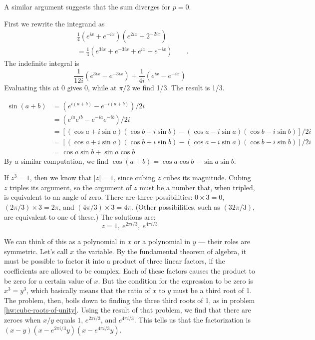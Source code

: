 A similar argument suggests that the sum diverges for $p=0$.


First we rewrite the integrand as
\begin{align*}
  & \frac{1}{4}\left(e^{ix}+e^{-ix}\right)\left(e^{2ix}+2^{-2ix}\right) \\
  &= \frac{1}{4}\left(e^{3ix}+e^{-3ix}+e^{ix}+e^{-ix}\right) \qquad .
\end{align*}
The indefinite integral is
\begin{equation*}
  \frac{1}{12i}\left(e^{3ix}-e^{-3ix}\right)+\frac{1}{4i}\left(e^{ix}-e^{-ix}\right)
\end{equation*}
Evaluating this at 0 gives 0, while at $\pi/2$ we find 1/3. The result is 1/3.

\begin{align*}
\sin(a+b) &= \left(e^{i(a+b)}-e^{-i(a+b)}\right)/2i \\
          &= \left(e^{ia}e^{ib}-e^{-ia}e^{-ib}\right)/2i \\
          &= \left[(\cos a+i\sin a)(\cos b+i\sin b)-(\cos a-i\sin a)(\cos b-i\sin b)\right]/2i \\
          &= \left[(\cos a+i\sin a)(\cos b+i\sin b)-(\cos a-i\sin a)(\cos b-i\sin b)\right]/2i \\
          &= \cos a\sin b +\sin a\cos b 
\end{align*}
By a similar computation, we find $\cos(a+b)=\cos a\cos b-\sin a\sin b$.

If $z^3=1$, then we know that $|z|=1$, since cubing $z$ cubes its magnitude. Cubing $z$ triples
its argument, so the argument of $z$ must be a number that, when tripled, is equivalent to an
angle of zero. There are three possibilities: $0\times 3=0$, $(2\pi/3)\times 3=2\pi$,
and $(4\pi/3)\times 3=4\pi$. (Other possibilities, such as $(32\pi/3)$, are equivalent to
one of these.) The solutions are:
\begin{equation*}
z = 1,\ e^{2\pi i/3},\ e^{4\pi i/3}
\end{equation*}

We can think of this as a polynomial in $x$ or a polynomial in $y$ --- their roles are symmetric. Let's call $x$ the variable.
By the fundamental theorem of algebra, it must be possible to factor it into a product of three
linear factors, if the coefficients are allowed to be complex. Each of these factors causes the
product to be zero for a certain value of $x$. But the condition for the expression to be
zero is $x^3=y^3$, which basically means that the ratio of $x$ to $y$ must be a third root of 1.
The problem, then, boils down to finding the three third roots of 1, as in
problem \ref{hw:cube-roots-of-unity}. Using the result of that problem, we find that there
are zeroes when $x/y$ equals $1$, $e^{2\pi i/3}$, and $e^{4\pi i/3}$. This tells us that
the factorization is $(x-y)(x-e^{2\pi i/3}y)(x-e^{4\pi i/3}y)$.

